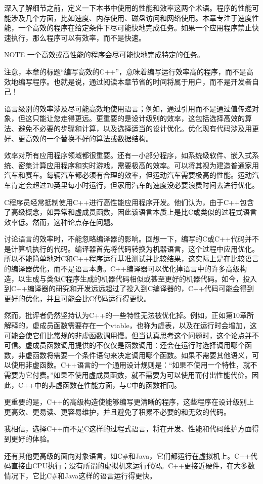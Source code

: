 
深入了解细节之前，定义一下本书中使用的性能和效率这两个术语。程序的性能可能涉及几个方面，比如速度、内存使用、磁盘访问和网络使用。本章专注于速度性能，一个高效的程序在给定条件下尽可能快地完成任务。如果一个应用程序禁止快速执行，那么程序可以有效率，而不是快速。

\begin{myNotic}{NOTE}
一个高效或高性能的程序会尽可能快地完成特定的任务。
\end{myNotic}

注意，本章的标题“编写高效的C++”，意味着编写运行效率高的程序，而不是高效地编写程序。也就是说，通过阅读本章节省的时间将属于用户，而不是开发者自己！


语言级别的效率涉及尽可能高效地使用语言；例如，通过引用而不是通过值传递对象，但这只能让您走得更远。更重要的是设计级别的效率，这包括选择高效的算法、避免不必要的步骤和计算，以及选择适当的设计优化。优化现有代码涉及用更好、更高效的一个替换不好的算法或数据结构。


效率对所有应用程序领域都很重要。还有一小部分程序，如系统级软件、嵌入式系统、密集计算应用程序和实时游戏，需要极高的效率。可以将其视为建造普通家用汽车和赛车。每辆汽车都必须有合理的效率，但运动汽车需要极高的性能。运动汽车肯定会超过70英里每小时运行，但家用汽车的速度没必要浪费时间去进行优化。


C程序员经常抵制使用C++进行高性能应用程序开发。他们认为，由于C++包含了高级概念，如异常和虚成员函数，因此该语言本质上是比C或类似的过程式语言效率低。然而，这种论点存在问题。

讨论语言的效率时，不能忽略编译器的影响。回想一下，编写的C或C++代码并不是计算机执行的代码。编译器首先将代码转换为机器语言，这个过程中应用优化。所以不能简单地对C和C++程序运行基准测试并比较结果，这实际上是在比较语言的编译器优化，而不是语言本身。C++编译器可以优化掉语言中的许多高级构造，以生成与类似C程序生成的机器代码相似或甚至更好的机器代码。如今，投入到C++编译器的研究和开发远远超过了投入到C编译器的，C++代码可能会得到更好的优化，并且可能会比C代码运行得更快。

然而，批评者仍然坚持认为C++的一些特性无法被优化掉。例如，正如第10章所解释的，虚成员函数需要存在一个vtable，也称为虚表，以及在运行时会增加，这可能会使它们比常规的非虚函数调用慢。但当认真思考这个问题时，这个论点并不可信。虚成员函数调用提供的不仅仅是函数调用：还会在运行时选择调用哪个函数，非虚函数将需要一个条件语句来决定调用哪个函数。如果不需要其他语义，可以使用非虚函数。C++语言的一个通用设计规则是：“如果不使用一个特性，就不需要为它付费。”如果不使用虚成员函数，就不需要为可以使用而付出性能代价。因此，C++中的非虚函数在性能方面，与C中的函数相同。

更重要的是，C++的高级构造使能够编写更清晰的程序，这些程序在设计级别上更高效、更易读、更容易维护，并且避免了积累不必要的和无效的代码。

我相信，选择C++而不是C这样的过程式语言，将在开发、性能和代码维护方面得到更好的体验。

还有其他更高级的面向对象语言，如C\#和Java，它们都运行在虚拟机上。C++代码直接由CPU执行；没有所谓的虚拟机来运行代码。C++更接近硬件，在大多数情况下，它比C\#和Java这样的语言运行得更快。









